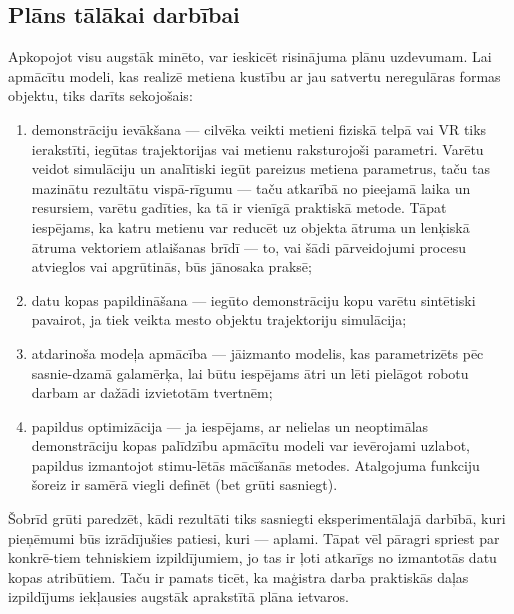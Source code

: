 \documentclass[12pt, a4paper]{article}
\numberwithin{equation}{section} %
\begin{document}
\subsection{Plāns tālākai darbībai}

Apkopojot visu augstāk minēto, var ieskicēt risinājuma plānu uzdevumam. Lai apmācītu modeli, kas realizē metiena kustību ar jau satvertu neregulāras formas objektu, tiks darīts sekojošais:

\begin{enumerate}
    \item demonstrāciju ievākšana --- cilvēka veikti metieni fiziskā telpā vai VR tiks ierakstīti, iegūtas trajektorijas vai metienu raksturojoši parametri. Varētu veidot simulāciju un analītiski iegūt pareizus metiena parametrus, taču tas mazinātu rezultātu vispā-rīgumu --- taču atkarībā no pieejamā laika un resursiem, varētu gadīties, ka tā ir vienīgā praktiskā metode. Tāpat iespējams, ka katru metienu var reducēt uz objekta ātruma un lenķiskā ātruma vektoriem atlaišanas brīdī --- to, vai šādi pārveidojumi procesu atvieglos vai apgrūtinās, būs jānosaka praksē;
    \item datu kopas papildināšana --- iegūto demonstrāciju kopu varētu sintētiski pavairot, ja tiek veikta mesto objektu trajektoriju simulācija;
    \item atdarinoša modeļa apmācība --- jāizmanto modelis, kas parametrizēts pēc sasnie-dzamā galamērķa, lai būtu iespējams ātri un lēti pielāgot robotu darbam ar dažādi izvietotām tvertnēm;
    \item papildus optimizācija --- ja iespējams, ar nelielas un neoptimālas demonstrāciju kopas palīdzību apmācītu modeli var ievērojami uzlabot, papildus izmantojot stimu-lētās mācīšanās metodes. Atalgojuma funkciju šoreiz ir samērā viegli definēt (bet grūti sasniegt).
\end{enumerate}

Šobrīd grūti paredzēt, kādi rezultāti tiks sasniegti eksperimentālajā darbībā, kuri pieņēmumi būs izrādījušies patiesi, kuri --- aplami. Tāpat vēl pāragri spriest par konkrē-tiem tehniskiem izpildījumiem, jo tas ir ļoti atkarīgs no izmantotās datu kopas atribūtiem. Taču ir pamats ticēt, ka maģistra darba praktiskās daļas izpildījums iekļausies augstāk aprakstītā plāna ietvaros.

\newpage
{}
\printbibliography[title=Atsauces]
\end{document}
